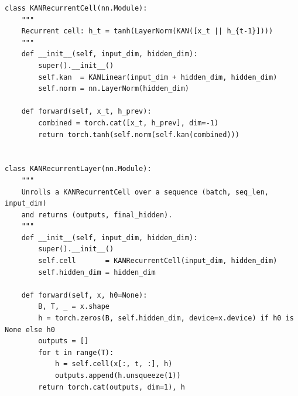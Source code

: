 \documentclass[12pt,a4paper]{report}
\begin{document}
\begin{lstlisting}[style=pythonstyle, caption={KANRecurrentCell --- Fully recurrent KAN cell (kan\_recurrent.py)}]
class KANRecurrentCell(nn.Module):
    """
    Recurrent cell: h_t = tanh(LayerNorm(KAN([x_t || h_{t-1}])))
    """
    def __init__(self, input_dim, hidden_dim):
        super().__init__()
        self.kan  = KANLinear(input_dim + hidden_dim, hidden_dim)
        self.norm = nn.LayerNorm(hidden_dim)

    def forward(self, x_t, h_prev):
        combined = torch.cat([x_t, h_prev], dim=-1)
        return torch.tanh(self.norm(self.kan(combined)))


class KANRecurrentLayer(nn.Module):
    """
    Unrolls a KANRecurrentCell over a sequence (batch, seq_len, input_dim)
    and returns (outputs, final_hidden).
    """
    def __init__(self, input_dim, hidden_dim):
        super().__init__()
        self.cell       = KANRecurrentCell(input_dim, hidden_dim)
        self.hidden_dim = hidden_dim

    def forward(self, x, h0=None):
        B, T, _ = x.shape
        h = torch.zeros(B, self.hidden_dim, device=x.device) if h0 is None else h0
        outputs = []
        for t in range(T):
            h = self.cell(x[:, t, :], h)
            outputs.append(h.unsqueeze(1))
        return torch.cat(outputs, dim=1), h
\end{lstlisting}
\end{document}
